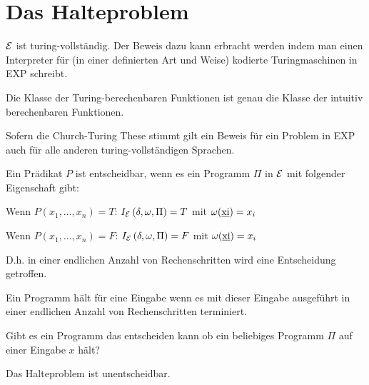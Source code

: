 {\begin{comment}
Es fällt auf, dass keinerlei Fehlerfälle bzw. Fehlerbehandlung in dem Interpreter vorkommen.
Dies ist für unsere Zwecke auch nicht nötig da wir nur syntaktisch korrekte Programme interpretieren wollen.

Den Interpreter IX kann auch sich selbst interpretieren. Dazu muss er nur in Listenkodierung gebracht werden.
\ifthenelse{\boolean{long}}{}{\end{comment}}

\section{Das Halteproblem}\label{sec:halteproblem}
$\mathcal{E}$ ist turing-vollständig. Der Beweis dazu kann erbracht werden indem man einen 
Interpreter für (in einer definierten Art und Weise) kodierte Turingmaschinen in EXP schreibt.
\begin{defn}
Die Klasse der Turing-berechenbaren Funktionen ist genau die Klasse der intuitiv berechenbaren Funktionen.
\end{defn}
Sofern die Church-Turing These stimmt gilt ein Beweis für ein Problem in EXP auch für alle anderen turing-vollständigen Sprachen.

\begin{defn}[Entscheidungsproblem]
Ein Prädikat $P$ ist entscheidbar, wenn es ein Programm $\Pi$ in $\mathcal{E}$ mit folgender Eigenschaft gibt:
\begin{\whichitem}
\item Wenn $P(x_1,\ldots,x_n)=T$: $I_{\mathcal{E}}\left(\delta,\omega,\Pi\right)=T$ mit $\omega(\text{\underline{xi}})=x_i$
\item Wenn $P(x_1,\ldots,x_n)=F$: $I_{\mathcal{E}}\left(\delta,\omega,\Pi\right)=F$ mit $\omega(\text{\underline{xi}})=x_i$
\end{\whichitem}
D.h. in einer endlichen Anzahl von Rechenschritten wird eine Entscheidung getroffen.
\end{defn}

Ein Programm hält für eine Eingabe wenn es mit dieser Eingabe ausgeführt in einer endlichen Anzahl von Rechenschritten terminiert.

\begin{defn}[Halteproblem]
Gibt es ein Programm das entscheiden kann ob ein beliebiges Programm $\Pi$ auf einer Eingabe $x$ hält?
\end{defn}

\begin{satz}
Das Halteproblem ist unentscheidbar.
\end{satz}

